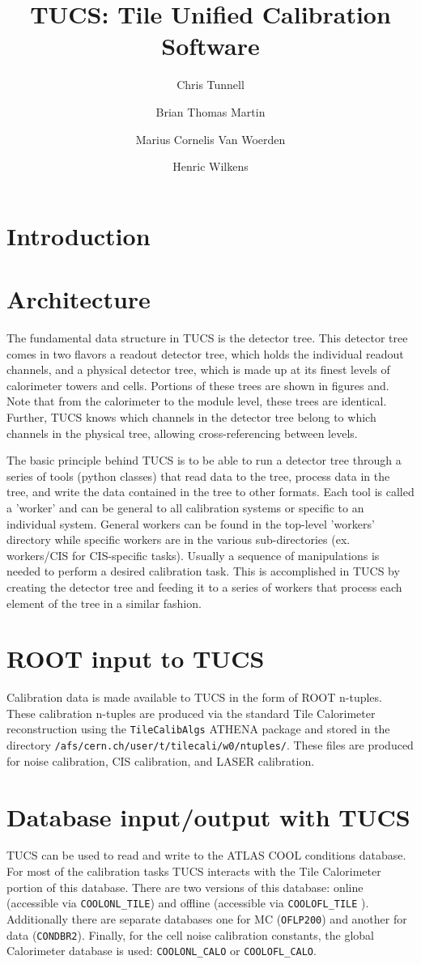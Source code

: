 \documentclass[11pt,a4paper]{atlasnote}
\title{TUCS: Tile Unified Calibration Software}
\author[a]{Chris Tunnell}
\author[b]{Brian Thomas Martin}
\author[c]{Marius Cornelis Van Woerden}
\author[d]{Henric Wilkens}
\affil[a]{University of Chicago}
\affil[b]{Michigan State University}
\affil[c]{Universiteit van Amsterdam}
\affil[d]{CERN}
\begin{document}
\section{Introduction}

\section{Architecture}
The fundamental data structure in TUCS is the detector tree.  This detector tree comes in two flavors a readout detector tree, which holds the individual readout channels, and a physical detector tree, which is made up at its finest levels of calorimeter towers and cells.  Portions of these trees are shown in figures and.  Note that from the calorimeter to the module level, these trees are identical.  Further, TUCS knows which channels in the detector tree belong to which channels in the physical tree, allowing cross-referencing between levels.

\par The basic principle behind TUCS is to be able to run a detector tree through a series of tools (python classes) that read data to the tree, process data in the tree, and write the data contained in the tree to other formats.  Each tool is called a 'worker' and can be general to all calibration systems or specific to an individual system.  General workers can be found in the top-level 'workers' directory while specific workers are in the various sub-directories (ex. workers/CIS for CIS-specific tasks).  Usually a sequence of manipulations is needed to perform a desired calibration task.  This is accomplished in TUCS by creating the detector tree and feeding it to a series of workers that process each element of the tree in a similar fashion. 

\section{ROOT input to TUCS}
Calibration data is made available to TUCS in the form of ROOT n-tuples.  These calibration n-tuples are produced via the standard Tile Calorimeter reconstruction using the {\tt TileCalibAlgs} ATHENA package and stored in the directory {\tt /afs/cern.ch/user/t/tilecali/w0/ntuples/}.  These files are produced for noise calibration, CIS calibration, and LASER calibration.

\section{Database input/output with TUCS}
TUCS can be used to read and write to the ATLAS COOL conditions database.  For most of the calibration tasks TUCS interacts with the Tile Calorimeter portion of this database.  There are two versions of this database: online (accessible via {\tt COOLONL\_TILE}) and offline (accessible via {\tt COOLOFL\_TILE} ).  Additionally there are separate databases one for MC ({\tt OFLP200}) and another for data ({\tt CONDBR2}).  Finally, for the cell noise calibration constants, the global Calorimeter database is used:  {\tt COOLONL\_CALO} or  {\tt COOLOFL\_CALO}.
\end{document}
